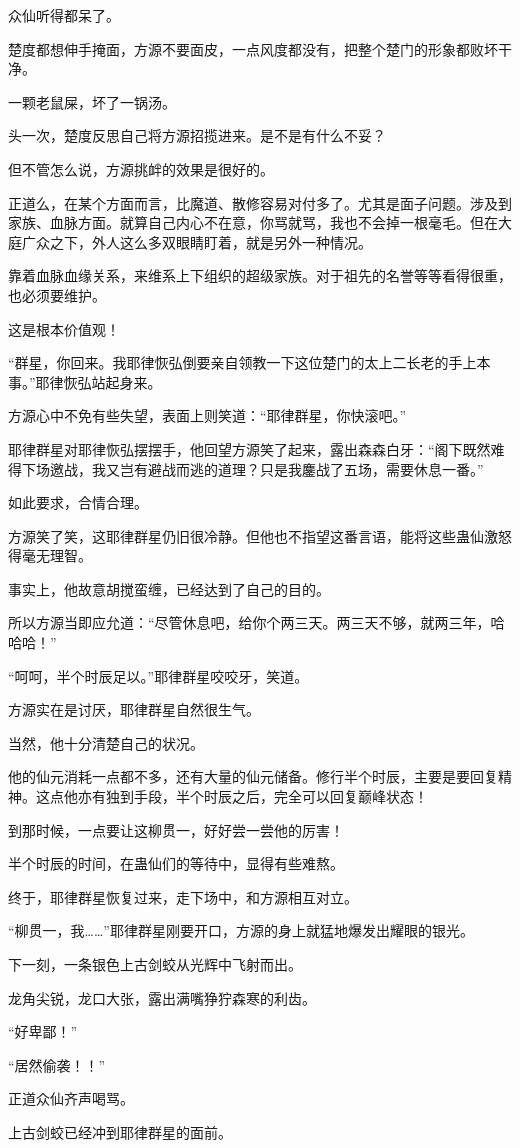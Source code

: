 \begin{this_body}
众仙听得都呆了。

楚度都想伸手掩面，方源不要面皮，一点风度都没有，把整个楚门的形象都败坏干净。

一颗老鼠屎，坏了一锅汤。

头一次，楚度反思自己将方源招揽进来。是不是有什么不妥？

但不管怎么说，方源挑衅的效果是很好的。

正道么，在某个方面而言，比魔道、散修容易对付多了。尤其是面子问题。涉及到家族、血脉方面。就算自己内心不在意，你骂就骂，我也不会掉一根毫毛。但在大庭广众之下，外人这么多双眼睛盯着，就是另外一种情况。

靠着血脉血缘关系，来维系上下组织的超级家族。对于祖先的名誉等等看得很重，也必须要维护。

这是根本价值观！

“群星，你回来。我耶律恢弘倒要亲自领教一下这位楚门的太上二长老的手上本事。”耶律恢弘站起身来。

方源心中不免有些失望，表面上则笑道：“耶律群星，你快滚吧。”

耶律群星对耶律恢弘摆摆手，他回望方源笑了起来，露出森森白牙：“阁下既然难得下场邀战，我又岂有避战而逃的道理？只是我鏖战了五场，需要休息一番。”

如此要求，合情合理。

方源笑了笑，这耶律群星仍旧很冷静。但他也不指望这番言语，能将这些蛊仙激怒得毫无理智。

事实上，他故意胡搅蛮缠，已经达到了自己的目的。

所以方源当即应允道：“尽管休息吧，给你个两三天。两三天不够，就两三年，哈哈哈！”

“呵呵，半个时辰足以。”耶律群星咬咬牙，笑道。

方源实在是讨厌，耶律群星自然很生气。

当然，他十分清楚自己的状况。

他的仙元消耗一点都不多，还有大量的仙元储备。修行半个时辰，主要是要回复精神。这点他亦有独到手段，半个时辰之后，完全可以回复巅峰状态！

到那时候，一点要让这柳贯一，好好尝一尝他的厉害！

半个时辰的时间，在蛊仙们的等待中，显得有些难熬。

终于，耶律群星恢复过来，走下场中，和方源相互对立。

“柳贯一，我……”耶律群星刚要开口，方源的身上就猛地爆发出耀眼的银光。

下一刻，一条银色上古剑蛟从光辉中飞射而出。

龙角尖锐，龙口大张，露出满嘴狰狞森寒的利齿。

“好卑鄙！”

“居然偷袭！！”

正道众仙齐声喝骂。

上古剑蛟已经冲到耶律群星的面前。

\end{this_body}

